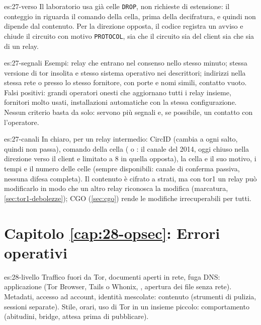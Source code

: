 \begin{soluzione}{es:27-verso}
Il laboratorio usa già celle \texttt{DROP}, non richieste di estensione: il conteggio in  riguarda il comando della cella, prima della decifratura, e quindi non dipende dal contenuto. Per la direzione opposta, il codice registra un avviso e chiude il circuito con motivo \texttt{PROTOCOL}, sia che il circuito sia del client sia che sia di un relay.
\end{soluzione}

\begin{soluzione}{es:27-segnali}
Esempi: relay che entrano nel consenso nello stesso minuto; stessa versione di tor insolita e stesso sistema operativo nei descrittori; indirizzi nella stessa rete o presso lo stesso fornitore, con porte e nomi simili, contatto vuoto. Falsi positivi: grandi operatori onesti che aggiornano tutti i relay insieme, fornitori molto usati, installazioni automatiche con la stessa configurazione. Nessun criterio basta da solo: servono più segnali e, se possibile, un contatto con l'operatore.
\end{soluzione}

\begin{soluzione}{es:27-canali}
In chiaro, per un relay intermedio: CircID (cambia a ogni salto, quindi non passa), comando della cella ( o : il canale del 2014, oggi chiuso nella direzione verso il client e limitato a 8 in quella opposta), la cella  e il suo motivo, i tempi e il numero delle celle (sempre disponibili: canale di conferma passiva, nessuna difesa completa). Il contenuto è cifrato a strati, ma con tor1 un relay può modificarlo in modo che un altro relay riconosca la modifica (marcatura, \cref{sec:tor1-debolezze}); CGO (\cref{sec:cgo}) rende le modifiche irrecuperabili per tutti.
\end{soluzione}

\section*{Capitolo \ref{cap:28-opsec}: Errori operativi}

\begin{soluzione}{es:28-livello}
Traffico fuori da Tor, documenti aperti in rete, fuga DNS: applicazione (Tor Browser, Tails o Whonix, , apertura dei file senza rete). Metadati, accesso ad account, identità mescolate: contenuto (strumenti di pulizia, sessioni separate). Stile, orari, uso di Tor in un insieme piccolo: comportamento (abitudini, bridge, attesa prima di pubblicare).
\end{soluzione}

